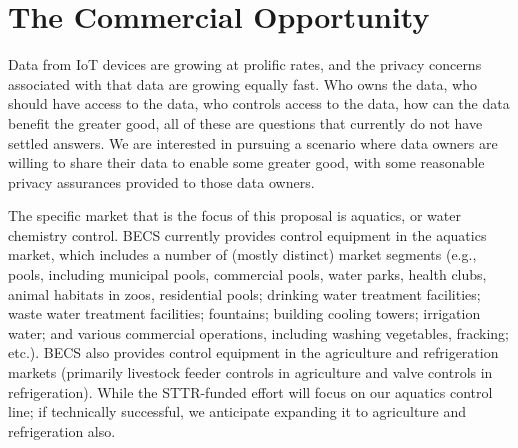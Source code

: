 \section{The Commercial Opportunity}
\label{sec:opportunity}

%

Data from IoT devices are growing at prolific rates, and the privacy concerns
associated with that data are growing equally fast.  Who owns the data, who
should have access to the data, who controls access to the data, how can
the data benefit the greater good, all of these are questions that currently
do not have settled answers.  We are interested in pursuing a scenario
where data owners are willing to share their data to enable some greater
good, with some reasonable privacy assurances provided to those data owners.

The specific market that is the focus of this proposal is aquatics, or
water chemistry control. BECS currently provides control equipment in
the aquatics market, which includes a number of (mostly distinct)
market segments (e.g., pools, including municipal pools, commercial
pools, water parks, health clubs, animal habitats in zoos, residential pools;
drinking water treatment facilities; waste water treatment facilities;
fountains; building cooling towers; irrigation water; and
various commercial operations, including washing vegetables, fracking; etc.).
BECS also provides control equipment in the
agriculture and refrigeration markets (primarily livestock feeder controls
in agriculture and valve controls in refrigeration).
While the STTR-funded effort will focus on our aquatics control line;
if technically successful, we anticipate expanding it to agriculture
and refrigeration also.

